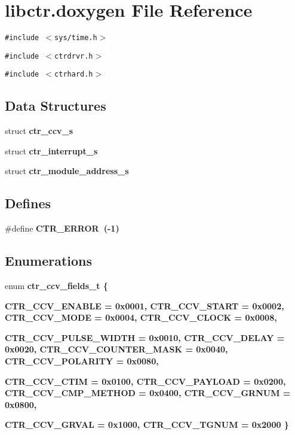 \section{libctr.doxygen File Reference}
\label{libctr_8doxygen}
{\tt \#include $<$sys/time.h$>$}\par
{\tt \#include $<$ctrdrvr.h$>$}\par
{\tt \#include $<$ctrhard.h$>$}\par
\subsection*{Data Structures}
\begin{CompactItemize}
\item 
struct \bf{ctr\_\-ccv\_\-s}
\item 
struct \bf{ctr\_\-interrupt\_\-s}
\item 
struct \bf{ctr\_\-module\_\-address\_\-s}
\end{CompactItemize}
\subsection*{Defines}
\begin{CompactItemize}
\item 
\#define \bf{CTR\_\-ERROR}~(-1)
\end{CompactItemize}
\subsection*{Enumerations}
\begin{CompactItemize}
\item 
enum \bf{ctr\_\-ccv\_\-fields\_\-t} \{ \par
\bf{CTR\_\-CCV\_\-ENABLE} =  0x0001, 
\bf{CTR\_\-CCV\_\-START} =  0x0002, 
\bf{CTR\_\-CCV\_\-MODE} =  0x0004, 
\bf{CTR\_\-CCV\_\-CLOCK} =  0x0008, 
\par
\bf{CTR\_\-CCV\_\-PULSE\_\-WIDTH} =  0x0010, 
\bf{CTR\_\-CCV\_\-DELAY} =  0x0020, 
\bf{CTR\_\-CCV\_\-COUNTER\_\-MASK} =  0x0040, 
\bf{CTR\_\-CCV\_\-POLARITY} =  0x0080, 
\par
\bf{CTR\_\-CCV\_\-CTIM} =  0x0100, 
\bf{CTR\_\-CCV\_\-PAYLOAD} =  0x0200, 
\bf{CTR\_\-CCV\_\-CMP\_\-METHOD} =  0x0400, 
\bf{CTR\_\-CCV\_\-GRNUM} =  0x0800, 
\par
\bf{CTR\_\-CCV\_\-GRVAL} =  0x1000, 
\bf{CTR\_\-CCV\_\-TGNUM} =  0x2000
 \}
\end{CompactItemize}
